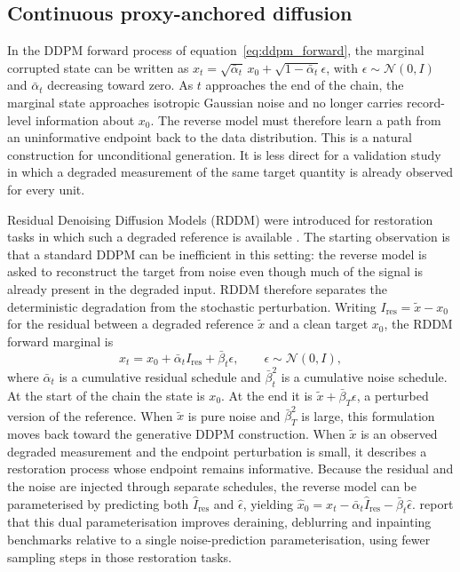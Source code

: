 \subsection{Continuous proxy-anchored diffusion}
\label{sec:sird_rddm}

In the DDPM forward process of equation~\eqref{eq:ddpm_forward}, the marginal corrupted state can be written as \(x_t = \sqrt{\bar{\alpha}_t}\,x_0 + \sqrt{1-\bar{\alpha}_t}\epsilon\), with \(\epsilon\sim\mathcal{N}(0,I)\) and \(\bar{\alpha}_t\) decreasing toward zero. As \(t\) approaches the end of the chain, the marginal state approaches isotropic Gaussian noise and no longer carries record-level information about \(x_0\). The reverse model must therefore learn a path from an uninformative endpoint back to the data distribution. This is a natural construction for unconditional generation. It is less direct for a validation study in which a degraded measurement of the same target quantity is already observed for every unit.

Residual Denoising Diffusion Models (RDDM) were introduced for restoration tasks in which such a degraded reference is available \citep{liu2024residual}. The starting observation is that a standard DDPM can be inefficient in this setting: the reverse model is asked to reconstruct the target from noise even though much of the signal is already present in the degraded input. RDDM therefore separates the deterministic degradation from the stochastic perturbation. Writing \(I_{\text{res}}=\tilde{x}-x_0\) for the residual between a degraded reference \(\tilde{x}\) and a clean target \(x_0\), the RDDM forward marginal is
\begin{equation}
x_t = x_0 + \bar{\alpha}_t I_{\text{res}} + \bar{\beta}_t \epsilon, \qquad \epsilon \sim \mathcal{N}(0, I),
\label{eq:rddm_forward}
\end{equation}
where \(\bar{\alpha}_t\) is a cumulative residual schedule and \(\bar{\beta}_t^2\) is a cumulative noise schedule. At the start of the chain the state is \(x_0\). At the end it is \(\tilde{x}+\bar{\beta}_T\epsilon\), a perturbed version of the reference. When \(\tilde{x}\) is pure noise and \(\bar{\beta}_T^2\) is large, this formulation moves back toward the generative DDPM construction. When \(\tilde{x}\) is an observed degraded measurement and the endpoint perturbation is small, it describes a restoration process whose endpoint remains informative. Because the residual and the noise are injected through separate schedules, the reverse model can be parameterised by predicting both \(\hat I_{\text{res}}\) and \(\hat\epsilon\), yielding \(\hat{x}_0=x_t-\bar{\alpha}_t\hat I_{\text{res}}-\bar{\beta}_t\hat\epsilon\). \citet{liu2024residual} report that this dual parameterisation improves deraining, deblurring and inpainting benchmarks relative to a single noise-prediction parameterisation, using fewer sampling steps in those restoration tasks.

